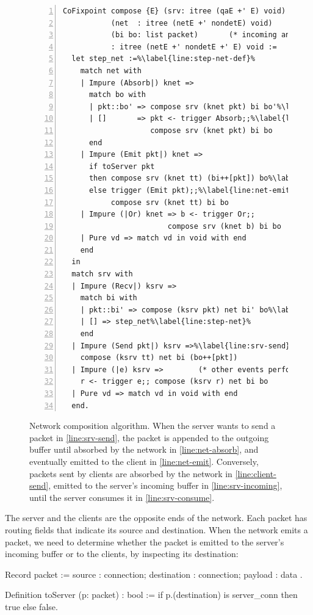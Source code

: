 \begin{figure}
\begin{lstlisting}[style=customcoq,numbers=left,escapechar=\%]
CoFixpoint compose {E} (srv: itree (qaE +' E) void)   (* server  model *)
           (net  : itree (netE +' nondetE) void)      (* network model *)
           (bi bo: list packet)       (* incoming and outgoing buffers *)
           : itree (netE +' nondetE +' E) void :=
  let step_net :=%\label{line:step-net-def}%
    match net with
    | Impure (Absorb|) knet =>
      match bo with
      | pkt::bo' => compose srv (knet pkt) bi bo'%\label{line:net-absorb}%
      | []       => pkt <- trigger Absorb;;%\label{line:client-send}%
                    compose srv (knet pkt) bi bo
      end
    | Impure (Emit pkt|) knet =>
      if toServer pkt
      then compose srv (knet tt) (bi++[pkt]) bo%\label{line:srv-incoming}%
      else trigger (Emit pkt);;%\label{line:net-emit}%
           compose srv (knet tt) bi bo
    | Impure (|Or) knet => b <- trigger Or;;
                        compose srv (knet b) bi bo
    | Pure vd => match vd in void with end
    end
  in
  match srv with
  | Impure (Recv|) ksrv =>
    match bi with
    | pkt::bi' => compose (ksrv pkt) net bi' bo%\label{line:srv-consume}%
    | [] => step_net%\label{line:step-net}%
    end
  | Impure (Send pkt|) ksrv =>%\label{line:srv-send}%
    compose (ksrv tt) net bi (bo++[pkt])
  | Impure (|e) ksrv =>        (* other events performed by the server *)
    r <- trigger e;; compose (ksrv r) net bi bo
  | Pure vd => match vd in void with end
  end.
\end{lstlisting}
\caption[Network composition algorithm]{Network composition algorithm.  When the
  server wants to send a packet in \autoref{line:srv-send}, the packet is
  appended to the outgoing buffer until absorbed by the network in
  \autoref{line:net-absorb}, and eventually emitted to the client in
  \autoref{line:net-emit}.  Conversely, packets sent by clients are absorbed by
  the network in \autoref{line:client-send}, emitted to the server's incoming
  buffer in \autoref{line:srv-incoming}, until the server consumes it in
  \autoref{line:srv-consume}.}
\label{fig:net-compose-code}
\end{figure}

The server and the clients are the opposite ends of the network.  Each packet
has routing fields that indicate its source and destination.  When the network
emits a packet, we need to determine whether the packet is emitted to the
server's incoming buffer or to the clients, by inspecting its destination:
\begin{coq}
  Record packet := {
    source      : connection;
    destination : connection;
    payload     : data
  }.

  Definition toServer (p: packet) : bool :=
    if p.(destination) is server_conn then true else false.
\end{coq}

